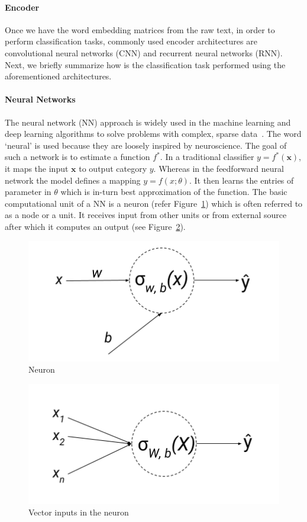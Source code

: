 \paragraph{Encoder} Once we have the word embedding matrices from the raw text, in order to perform classification tasks, commonly used encoder architectures are convolutional neural networks (CNN) and recurrent neural networks (RNN). Next, we briefly summarize how is the classification task performed using the aforementioned architectures.

\paragraph{Neural Networks}
The neural network (NN) approach is widely used in the machine learning and deep learning algorithms to solve problems with complex, sparse data~\cite{lecun2015deep}. The word `neural' is used because they are loosely inspired by neuroscience. 
The goal of such a network is to estimate a function $f^*$.  In a traditional classifier $ y = f^*(\textbf{x})$, it maps the input $\textbf{x}$ to output category $y$. Whereas in the feedforward neural network the model defines a mapping $ y = f(x;\theta)$. It then learns the entries of parameter in $\theta$ which is in-turn best approximation of the function. 
The basic computational unit of a NN is a neuron (refer Figure~\ref{fig:neuron}) which is often referred to as a node or a unit. It receives input from other units or from external source after which it computes an output (see Figure~\ref{fig:vectorinputs}).
\begin{figure}[!htb]
    \centering
    \includegraphics[scale=0.6]{Figures/neuron.png}
    \caption{Neuron}
    \label{fig:neuron}
\end{figure}
\begin{figure}[!htb]
    \centering
    \includegraphics[scale=0.6]{Figures/Vector-Inputs-to-Neuron.png}
    \caption{Vector inputs in the neuron}
    \label{fig:vectorinputs}
\end{figure}
